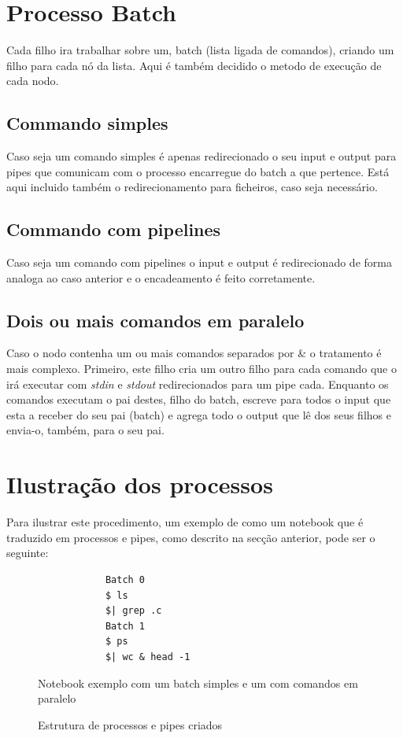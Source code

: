 \documentclass[12pt,a4paper]{report}
\begin{document}
    \section{Processo Batch}
        Cada filho ira trabalhar sobre um, batch (lista ligada de comandos),
        criando um filho para cada nó da lista. Aqui é também decidido o metodo
        de execução de cada nodo.
        \subsection{Commando simples}
            Caso seja um comando simples é apenas redirecionado o seu input e
            output para pipes que comunicam com o processo encarregue do batch a
            que pertence. Está aqui incluido também o redirecionamento para
            ficheiros, caso seja necessário.
        \subsection{Commando com pipelines}
            Caso seja um comando com pipelines o input e output é redirecionado
            de forma analoga ao caso anterior e o encadeamento é feito
            corretamente.
        \subsection{Dois ou mais comandos em paralelo}
            Caso o nodo contenha um ou mais comandos separados por \& o
            tratamento é mais complexo. Primeiro, este filho cria um outro
            filho para cada comando que o irá executar com \textit{stdin}
            e \textit{stdout} redirecionados para um pipe cada. Enquanto os
            comandos executam o pai destes, filho do batch, escreve para todos
            o input que esta a receber do seu pai (batch) e agrega todo o
            output que lê dos seus filhos e envia-o, também, para o seu pai.
\clearpage
    \section{Ilustração dos processos}
    Para ilustrar este procedimento, um exemplo de como um notebook que é
    traduzido em processos e pipes, como descrito na secção anterior, pode
    ser o seguinte:
    \begin{figure}[h]
        \begin{verbatim}
            Batch 0
            $ ls
            $| grep .c
            Batch 1
            $ ps
            $| wc & head -1
        \end{verbatim}
        \caption{Notebook exemplo com um batch simples e um com comandos em
                paralelo}
    \end{figure}
    \begin{figure}[h]
        
        \caption{Estrutura de processos e pipes criados}
    \end{figure}
\end{document}
